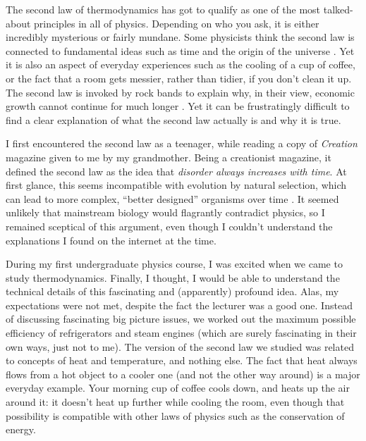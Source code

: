 \documentclass[a4paper, 12pt]{article}
\title{}
\author{Brendon J. Brewer}
\begin{document}
\sffamily
\maketitle

The second law of thermodynamics has got to qualify as one of the most
talked-about principles in all of physics. Depending on who you ask, it is
either incredibly mysterious or fairly mundane. Some physicists think
the second law is connected to
fundamental ideas such as time and the origin of the universe
\citep{carroll}. Yet it is also an aspect of everyday experiences
such as the cooling of a
cup of coffee, or the fact that a room gets messier, rather than tidier,
if you don't clean it up. The second law is invoked by rock bands to explain
why, in their
view, economic growth cannot continue for much longer \citep{muse}.
Yet it can be frustratingly difficult to find a
clear explanation of what the second law actually is and why it is true.

I first encountered the second law
as a teenager, while reading a copy of {\em Creation} magazine given to me
by my grandmother. Being a creationist magazine, it defined the second law as
the idea that {\em disorder always increases with time}.
At first glance, this seems incompatible with evolution by
natural selection, which can lead to more complex,
``better designed'' organisms over time \citep{dawkins}.
It seemed unlikely that mainstream biology would flagrantly
contradict physics, so I remained sceptical of this argument,
even though I couldn't understand the explanations I found on the
internet at the time.

During my first undergraduate physics course, I was excited when we came to
study thermodynamics. Finally, I thought, I would be able to understand the
technical details of this fascinating and (apparently) profound idea.
Alas, my expectations were not met, despite the fact the lecturer was a
good one.
Instead of discussing fascinating big picture issues, we
worked out the maximum possible efficiency of refrigerators and steam engines
(which are surely fascinating in their own ways, just not to me).
The version of the second law we studied was related to concepts of heat
and temperature, and nothing else.
The fact that heat always flows from a hot object to a cooler
one (and not the other way around) is a major everyday example. Your morning
cup of coffee cools down, and heats up the air around it: it doesn't heat
up further while cooling the room, even though that possibility is compatible
with other laws of physics such as the conservation of energy.
\end{document}
